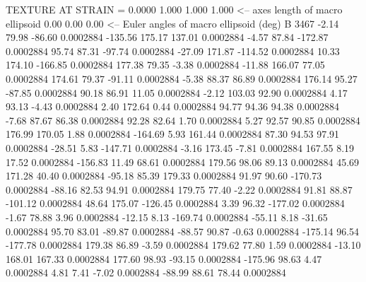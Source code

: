 TEXTURE AT STRAIN =    0.0000
   1.000   1.000   1.000  <-- axes length of macro ellipsoid
    0.00    0.00    0.00  <-- Euler angles of macro ellipsoid (deg)
B      3467
       -2.14       79.98      -86.60     0.0002884
     -135.56      175.17      137.01     0.0002884
       -4.57       87.84     -172.87     0.0002884
       95.74       87.31      -97.74     0.0002884
      -27.09      171.87     -114.52     0.0002884
       10.33      174.10     -166.85     0.0002884
      177.38       79.35       -3.38     0.0002884
      -11.88      166.07       77.05     0.0002884
      174.61       79.37      -91.11     0.0002884
       -5.38       88.37       86.89     0.0002884
      176.14       95.27      -87.85     0.0002884
       90.18       86.91       11.05     0.0002884
       -2.12      103.03       92.90     0.0002884
        4.17       93.13       -4.43     0.0002884
        2.40      172.64        0.44     0.0002884
       94.77       94.36       94.38     0.0002884
       -7.68       87.67       86.38     0.0002884
       92.28       82.64        1.70     0.0002884
        5.27       92.57       90.85     0.0002884
      176.99      170.05        1.88     0.0002884
     -164.69        5.93      161.44     0.0002884
       87.30       94.53       97.91     0.0002884
      -28.51        5.83     -147.71     0.0002884
       -3.16      173.45       -7.81     0.0002884
      167.55        8.19       17.52     0.0002884
     -156.83       11.49       68.61     0.0002884
      179.56       98.06       89.13     0.0002884
       45.69      171.28       40.40     0.0002884
      -95.18       85.39      179.33     0.0002884
       91.97       90.60     -170.73     0.0002884
      -88.16       82.53       94.91     0.0002884
      179.75       77.40       -2.22     0.0002884
       91.81       88.87     -101.12     0.0002884
       48.64      175.07     -126.45     0.0002884
        3.39       96.32     -177.02     0.0002884
       -1.67       78.88        3.96     0.0002884
      -12.15        8.13     -169.74     0.0002884
      -55.11        8.18      -31.65     0.0002884
       95.70       83.01      -89.87     0.0002884
      -88.57       90.87       -0.63     0.0002884
     -175.14       96.54     -177.78     0.0002884
      179.38       86.89       -3.59     0.0002884
      179.62       77.80        1.59     0.0002884
      -13.10      168.01      167.33     0.0002884
      177.60       98.93      -93.15     0.0002884
     -175.96       98.63        4.47     0.0002884
        4.81        7.41       -7.02     0.0002884
      -88.99       88.61       78.44     0.0002884
